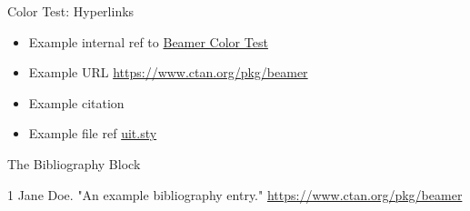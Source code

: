 \begin{frame}{Color Test: Hyperlinks}

    \begingroup
        \scriptsize
        \begin{testcolors}
        \end{testcolors}
    \endgroup

    \medskip

    \begin{itemize}
        \item Example internal ref to \hyperref[beamercolortest]{Beamer Color Test}
        \item Example URL \url{https://www.ctan.org/pkg/beamer}
        \item Example citation \cite{aa}
        \item Example file ref \url{uit.sty}
    \end{itemize}

    \medskip

    \begin{block}{The Bibliography Block}
        \begin{thebibliography}{1}
             Jane Doe. "An example bibliography entry."
                \url{https://www.ctan.org/pkg/beamer}
        \end{thebibliography}
    \end{block}
\end{frame}

